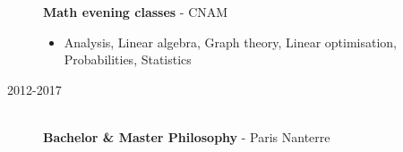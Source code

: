 \documentclass[a4paper,10pt]{article}
\begin{document}
\begin{adjustbox}{valign=t}
\begin{minipage}{0.6\textwidth}
\begin{description}
                  \textbf{Math evening classes} - CNAM
                  \small
                  \begin{itemize}[topsep=0pt]
                      \item Analysis, Linear algebra, Graph theory, Linear optimisation, Probabilities, Statistics
                  \end{itemize}
                  \normalsize
            \item [\normalfont \textcolor{ColorOne}{2012-2017}]~\\
                  \textbf{Bachelor \& Master Philosophy} -  Paris Nanterre
        \end{description}
    \end{minipage}
\end{adjustbox}
\end{document}
